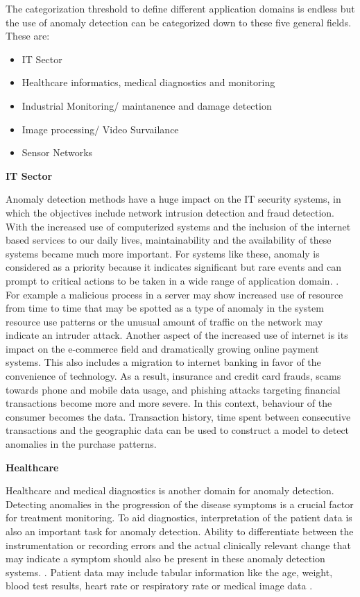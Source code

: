 The categorization threshold to define different application domains is endless but the use of
anomaly detection can be categorized down to these five general fields.
\cite{Pimentel:2014:RRN:2588908.2589196}
These are:
\begin{itemize}
    \item IT Sector 
    \item Healthcare informatics, medical diagnostics and monitoring
    \item Industrial Monitoring/ maintanence and damage detection
    \item Image processing/ Video Survailance
    \item Sensor Networks
\end{itemize}

\textbf{ IT Sector}

Anomaly detection methods have a huge impact on the IT security systems, in which the objectives
include network intrusion detection and fraud detection. \cite{Pimentel:2014:RRN:2588908.2589196}
With the increased use of computerized systems and the inclusion of the internet based services to
our daily lives, maintainability and the availability of these systems became much more important.
For systems like these, anomaly is considered as a priority because it indicates significant but
rare events and can prompt to critical actions to be taken in a wide range of application domain.
\cite{AHMED201619}. For example a malicious process in a server may show increased use of resource
from time to time that may be spotted as a type of anomaly in the system resource use patterns or
the unusual amount of traffic on the network may indicate an intruder attack. \cite{FERNANDES20161}
\cite{JABEZ2015338} Another aspect of the increased use of internet is its impact on the e-commerce
field and dramatically growing online payment systems. This also includes a migration to internet
banking in favor of the convenience of technology. As a result, insurance and credit card frauds,
scams towards phone and mobile data usage, and phishing attacks targeting financial transactions
become more and more severe. \cite{finance_anomaly} In this context, behaviour of the consumer
becomes the data. Transaction history, time spent between consecutive transactions and the
geographic data can be used to construct a model to detect anomalies in the purchase patterns.

\textbf{ Healthcare}

Healthcare and medical diagnostics is another domain for anomaly detection. Detecting anomalies in
the progression of the disease symptoms is a crucial factor for treatment monitoring.
\cite{Schlegl2017UnsupervisedAD} To aid diagnostics, interpretation of the patient data is also an
important task for anomaly detection. Ability to differentiate between the instrumentation or
recording errors and the actual clinically relevant change that may indicate a symptom should also
be present in these anomaly detection systems. \cite{Pimentel:2014:RRN:2588908.2589196}. Patient
data may include tabular information like the age, weight, blood test results, heart rate or
respiratory rate \cite{inproceedings_medical}\cite{Markou:2003:NDR:959414.959416} or medical image data
\cite{Schlegl2017UnsupervisedAD}. 

